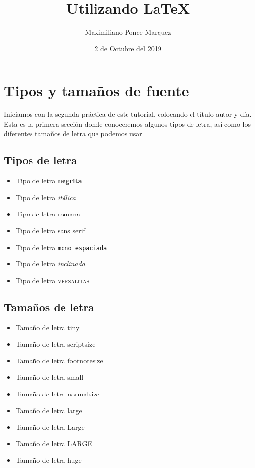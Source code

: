 \documentclass[12pt]{article}
\begin{document}
\title{Utilizando \LaTeX}
\author{Maximiliano Ponce Marquez}
\date{2 de Octubre del 2019}
\maketitle

\newpage

\tableofcontents

\newpage

\section{Tipos y tamaños de fuente}
Iniciamos con la segunda práctica de este tutorial,
colocando el título autor y día. Esta es la primera
sección donde conoceremos algunos tipos de letra, así
como los diferentes tamaños de letra que podemos usar
\subsection{Tipos de letra}
\begin{itemize}
\item Tipo de letra \textbf{negrita}
\item Tipo de letra \textit{itálica}
\item Tipo de letra \textrm{romana}
\item Tipo de letra \textsf{sans serif}
\item Tipo de letra \texttt{mono espaciada}
\item Tipo de letra \textsl{inclinada}
\item Tipo de letra \textsc{versalitas}
\end{itemize}

\newpage

\subsection{Tamaños de letra}
\begin{itemize}
\item {\tiny Tamaño de letra} tiny
\item {\scriptsize Tamaño de letra} scriptsize
\item {\footnotesize Tamaño de letra} footnotesize
\item {\small Tamaño de letra} small
\item {\normalsize Tamaño de letra} normalsize
\item {\large Tamaño de letra} large
\item {\Large Tamaño de letra} Large
\item {\LARGE Tamaño de letra} LARGE
\item {\huge Tamaño de letra} huge
\end{itemize}
\end{document}
